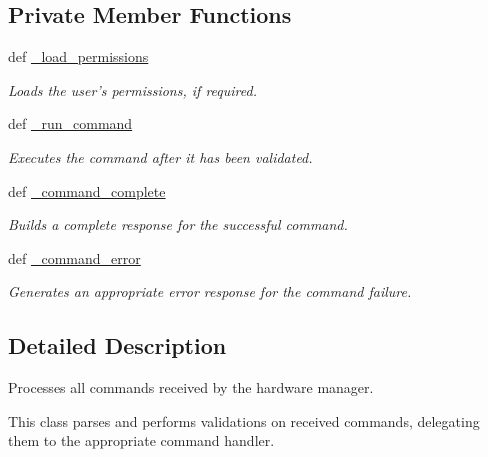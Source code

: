\subsection*{Private Member Functions}
\begin{DoxyCompactItemize}
\item 
def \hyperlink{classhwm_1_1command_1_1parser_1_1_command_parser_a47cef501a1476ff0057682e61a366fd6}{\-\_\-load\-\_\-permissions}
\begin{DoxyCompactList}\small\item\em Loads the user's permissions, if required. \end{DoxyCompactList}\item 
def \hyperlink{classhwm_1_1command_1_1parser_1_1_command_parser_aa73d2febe867798267139571ddad26d9}{\-\_\-run\-\_\-command}
\begin{DoxyCompactList}\small\item\em Executes the command after it has been validated. \end{DoxyCompactList}\item 
def \hyperlink{classhwm_1_1command_1_1parser_1_1_command_parser_a40cc95046bc15292efea3cdaf846353c}{\-\_\-command\-\_\-complete}
\begin{DoxyCompactList}\small\item\em Builds a complete response for the successful command. \end{DoxyCompactList}\item 
def \hyperlink{classhwm_1_1command_1_1parser_1_1_command_parser_a5e7cadb7dd0a59464f315a8de45be9b1}{\-\_\-command\-\_\-error}
\begin{DoxyCompactList}\small\item\em Generates an appropriate error response for the command failure. \end{DoxyCompactList}\end{DoxyCompactItemize}


\subsection{Detailed Description}
Processes all commands received by the hardware manager. 

This class parses and performs validations on received commands, delegating them to the appropriate command handler. 

